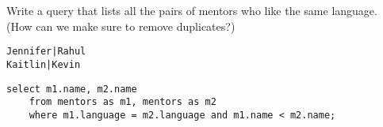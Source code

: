 \begin{blocksection}
\question Write a query that lists all the pairs of mentors who like the same language. (How can we make sure to remove duplicates?)

\begin{lstlisting}
Jennifer|Rahul
Kaitlin|Kevin

\end{lstlisting}

\begin{solution}[1in]
\begin{lstlisting}
select m1.name, m2.name
    from mentors as m1, mentors as m2
    where m1.language = m2.language and m1.name < m2.name;
\end{lstlisting}
\end{solution}
\end{blocksection}
